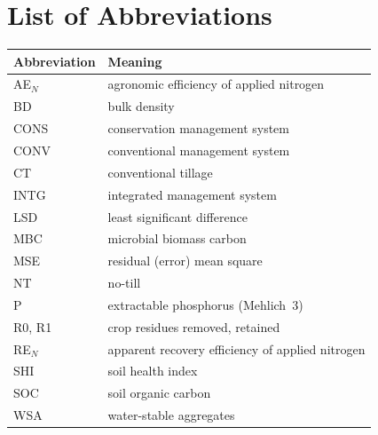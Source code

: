 \chapter{List of Abbreviations}

\begin{center}
\begin{tabular}{@{}ll@{}}
  \toprule
  Abbreviation & Meaning \\
  \midrule
  AE$_N$   & agronomic efficiency of applied nitrogen \\
  BD       & bulk density \\
  CONS     & conservation management system \\
  CONV     & conventional management system \\
  CT       & conventional tillage \\
  INTG     & integrated management system \\
  LSD      & least significant difference \\
  MBC      & microbial biomass carbon \\
  MSE      & residual (error) mean square \\
  NT       & no-till \\
  P        & extractable phosphorus (Mehlich~3) \\
  R0, R1   & crop residues removed, retained \\
  RE$_N$   & apparent recovery efficiency of applied nitrogen \\
  SHI      & soil health index \\
  SOC      & soil organic carbon \\
  WSA      & water-stable aggregates \\
  \bottomrule
\end{tabular}
\end{center}
